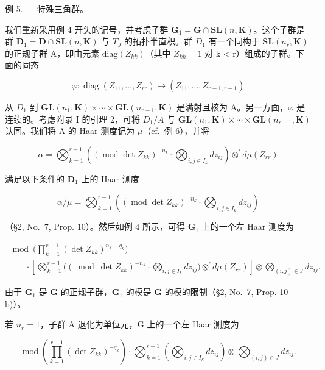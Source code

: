 例 5. --- 特殊三角群。

我们重新采用例 4 开头的记号，并考虑子群 \(\mathbf{G}_{1} = \mathbf{G} \cap \mathbf{SL}(n, \mathbf{K})\)。这个子群是群 \(\mathbf{D}_{1} = \mathbf{D} \cap \mathbf{SL}(n, \mathbf{K})\) 与 \(T_{J}\) 的拓扑半直积。群 \(D_{1}\) 有一个同构于 \(\mathbf{SL}(n_{r}, \mathbf{K})\) 的正规子群 A，即由元素 \(\text{diag}(Z_{kk})\)（其中 \(Z_{kk} = 1\) 对 k \textless{} r）组成的子群。下面的同态

\[
\varphi : \operatorname{diag} (Z _ {1 1}, \dots , Z _ {r r}) \mapsto (Z _ {1 1}, \dots , Z _ {r - 1, r - 1})
\]

从 \(D_{1}\) 到 \(\mathbf{GL}(n_{1},\mathbf{K})\times\cdots\times\mathbf{GL}(n_{r-1},\mathbf{K})\) 是满射且核为 A。另一方面，\(\varphi\) 是连续的。考虑附录 I 的引理 2，可将 \(D_{1}/A\) 与 \(\mathbf{GL}(n_{1},\mathbf{K})\times\cdots\times\mathbf{GL}(n_{r-1},\mathbf{K})\) 认同。我们将 A 的 Haar 测度记为 \(\mu\)（cf.~例 6），并将

\[
\alpha = \bigotimes_ {k = 1} ^ {r - 1} \left(\left(\operatorname{mod} \det Z _ {k k}\right) ^ {- n _ {k}} \cdot \bigotimes_ {i, j \in I _ {k}} d z _ {i j}\right) \otimes^ {\prime} d \mu \left(Z _ {r r}\right)
\]

满足以下条件的 \(\mathbf{D}_1\) 上的 Haar 测度

\[
\alpha / \mu = \bigotimes_ {k = 1} ^ {r - 1} \left(\left(\operatorname{mod} \det Z _ {k k}\right) ^ {- n _ {k}} \cdot \bigotimes_ {i, j \in I _ {k}} d z _ {i j}\right)
\]

（§2, No.~7, Prop. 10）。然后如例 4 所示，可得 \(\mathbf{G}_1\) 上的一个左 Haar 测度为

\[
\begin{array}{l} \bmod \Big (\prod_ {k = 1} ^ {r - 1} (\det Z _ {k k}) ^ {n _ {k} - q _ {k}} \Big) \\ \qquad \cdot \left[ \bigotimes_ {k = 1} ^ {r - 1} \big ((\bmod \det Z _ {k k}) ^ {- n _ {k}} \cdot \bigotimes_ {i, j \in I _ {k}} d z _ {i j} \big) \otimes^ {\prime} d \mu (Z _ {r r}) \right] \otimes \bigotimes_ {(i, j) \in J} d z _ {i j}. \end{array}
\]

由于 \(\mathbf{G}_1\) 是 \(\mathbf{G}\) 的正规子群，\(\mathbf{G}_1\) 的模是 \(\mathbf{G}\) 的模的限制（§2, No.~7, Prop. 10 b)）。

若 \(n_{r}=1\)，子群 A 退化为单位元，G 上的一个左 Haar 测度为

\[
\operatorname{mod} \left(\prod_ {k = 1} ^ {r - 1} (\det Z _ {k k}) ^ {- q _ {k}}\right) \cdot \bigotimes_ {k = 1} ^ {r - 1} \left(\bigotimes_ {i, j \in I _ {k}} d z _ {i j}\right) \otimes \bigotimes_ {(i, j) \in J} d z _ {i j}.
\]


